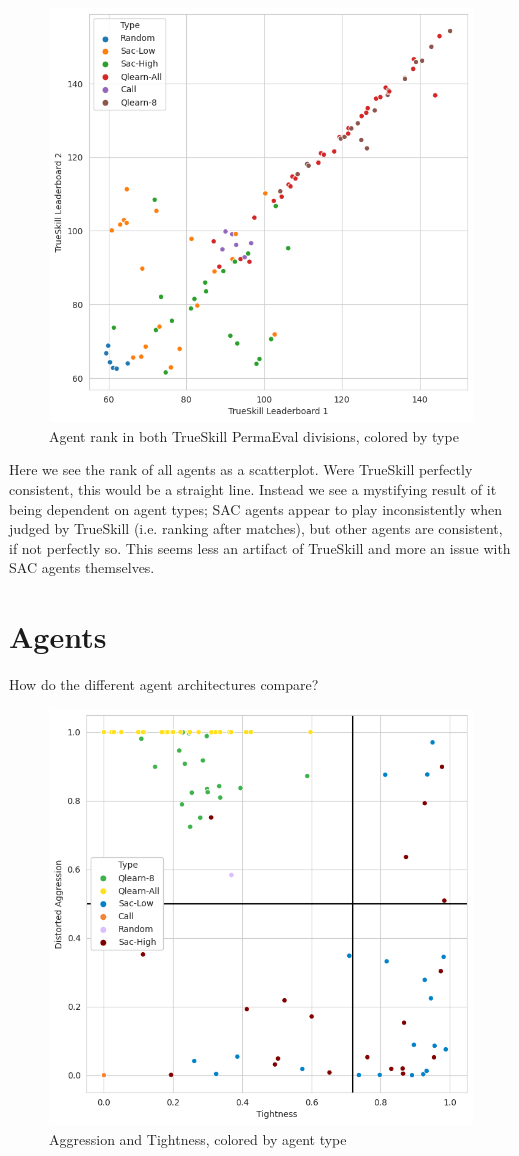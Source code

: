 \begin{figure}[H]
\centering
    \includegraphics[width=0.8\linewidth]{Results/figures/trueskill_comparison.png}
\caption{Agent rank in both TrueSkill PermaEval divisions, colored by type}
\label{TrueSkillCompare2}
\end{figure}

Here we see the rank of all agents as a scatterplot. Were TrueSkill perfectly consistent, this would be a straight line. Instead we see a mystifying result of it being dependent on agent types; SAC agents appear to play inconsistently when judged by TrueSkill (i.e. ranking after matches), but other agents are consistent, if not perfectly so. This seems less an artifact of TrueSkill and more an issue with SAC agents themselves.

\section{Agents}
\label{ResultsAgents}
How do the different agent architectures compare?

\begin{figure}[H]
\centering
    \includegraphics[width=0.8\linewidth]{Results/figures/traditional_scatterplot_Type.png}
\caption{Aggression and Tightness, colored by agent type}
\label{AggTightAgentType}
\end{figure}

